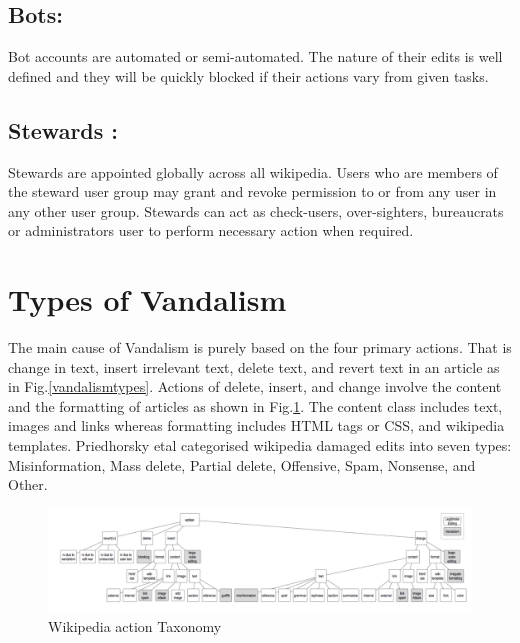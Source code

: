 \documentclass[12pt]{article}
\begin{document}
\subsection*{Bots:}
 Bot accounts are automated or semi-automated. The nature of their edits is well defined and they will be quickly blocked if their actions vary from  given tasks.
 \subsection*{Stewards :}
Stewards are appointed globally across all wikipedia. Users who are members of the steward user group may grant and revoke permission to or from any user in any other user group. Stewards can act as check-users, over-sighters, bureaucrats or administrators user to perform necessary action when required.
\section{Types of Vandalism  }
The main cause of Vandalism is purely based on the four primary actions. That is change in text, insert irrelevant text, delete text, and revert text in an article as in Fig.\ref{vandalismtypes}. Actions of delete, insert, and change involve the content and the formatting of articles as shown in Fig.\ref{Taxanomy}. The content class includes text, images and links whereas formatting includes HTML tags or CSS, and wikipedia templates.
Priedhorsky etal\cite{creating} categorised wikipedia damaged edits into seven types: Misinformation, Mass
delete, Partial delete, Offensive, Spam, Nonsense, and Other.
\begin{figure}[h]
\centering
\includegraphics[scale=0.45]{taxnomy.png}
\caption{Wikipedia action Taxonomy \cite{active}}
\label{Taxanomy}
\end{figure}
\end{document}
